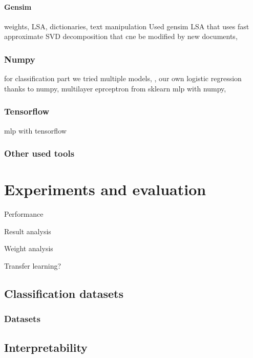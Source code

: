        
        \subsubsection{Gensim}
        weights, LSA, dictionaries, text manipulation
        Used gensim LSA that uses fast approximate SVD decomposition that cne be modified by new documents,
        
        \cite{rehurek_lrec}
        \* %
        \* %
        \* %
        
        
        \subsection{Numpy}
        \cite{bird2009natural} %
        \cite{oliphant2006guide} %
        for classification part we tried multiple models, , 
        our own logistic regression thanks to numpy, multilayer eprceptron from sklearn
        mlp with numpy, 
         \* %

        \subsection{Tensorflow}
        mlp with tensorflow
        \* %
        \* %
        \* %
    
        \subsection{Other used tools}
        \cite{perez2007ipython} %
        \* %
        \* %
        \* %
        \cite{hunter2007matplotlib} %
        \cite{mckinney2010data} %
        
        
        

\chapter{Experiments and evaluation}

    Performance
    
    Result analysis
    
    Weight analysis
    
    Transfer learning?

    \section{Classification datasets}
        \subsection{Datasets}
            \cite{conneau2017supervised} %

    \section{Interpretability}
        \cite{ribeiro2016should} %


